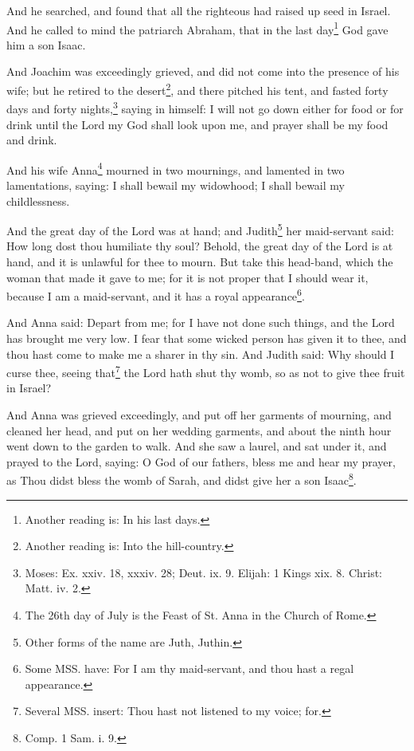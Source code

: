 \documentclass[12pt]{book} %
\begin{document}
\begin{pairs}
\begin{Rightside}
\pend\pstart
And he searched, and found that all the righteous had raised up seed in Israel. And he called to mind the patriarch Abraham, that in the last day\footnote{Another reading is: In his last days.} God gave him a son Isaac.

\pend\pstart
And Joachim was exceedingly grieved, and did not come into the presence of his wife; but he retired to the desert\footnote{Another reading is: Into the hill-country.}, and there pitched his tent, and fasted forty days and forty nights,\footnote{Moses: Ex. xxiv. 18, xxxiv. 28; Deut. ix. 9. Elijah: 1 Kings xix. 8. Christ: Matt. iv. 2.} saying in himself: I will not go down either for food or for drink until the Lord my God shall look upon me, and prayer shall be my food and drink.

\pend\pstart
{}

\pend\pstart
And his wife Anna\footnote{The 26th day of July is the Feast of St. Anna in the Church of Rome.} mourned in two mournings, and lamented in two lamentations, saying: I shall bewail my widowhood; I shall bewail my childlessness.

\pend\pstart
And the great day of the Lord was at hand; and Judith\footnote{Other forms of the name are Juth, Juthin.} her maid-servant said: How long dost thou humiliate thy soul? Behold, the great day of the Lord is at hand, and it is unlawful for thee to mourn. But take this head-band, which the woman that made it gave to me; for it is not proper that I should wear it, because I am a maid-servant, and it has a royal appearance\footnote{Some MSS. have: For I am thy maid-servant, and thou hast a regal appearance.}.

\pend\pstart
And Anna said: Depart from me; for I have not done such things, and the Lord has brought me very low. I fear that some wicked person has given it to thee, and thou hast come to make me a sharer in thy sin. And Judith said: Why should I curse thee, seeing that\footnote{Several MSS. insert: Thou hast not listened to my voice; for.} the Lord hath shut thy womb, so as not to give thee fruit in Israel?

\pend\pstart
And Anna was grieved exceedingly, and put off her garments of mourning, and cleaned her head, and put on her wedding garments, and about the ninth hour went down to the garden to walk. And she saw a laurel, and sat under it, and prayed to the Lord, saying: O God of our fathers, bless me and hear my prayer, as Thou didst bless the womb of Sarah, and didst give her a son Isaac\footnote{Comp. 1 Sam. i. 9.}.


\end{Rightside}
\end{pairs}
\end{document}

